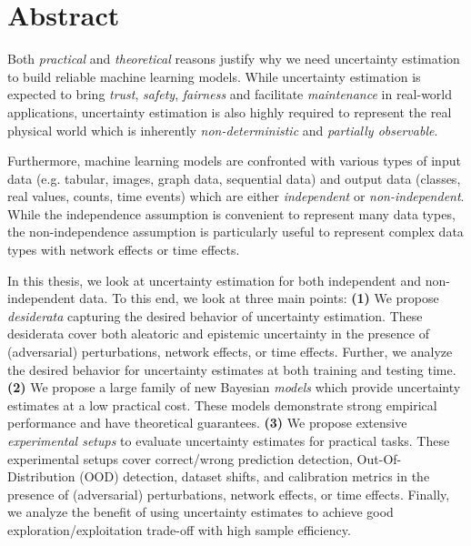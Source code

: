 \chapter*{Abstract}
%

Both \emph{practical} and \emph{theoretical} reasons justify why we need uncertainty estimation to build reliable machine learning models. While uncertainty estimation is expected to bring \emph{trust}, \emph{safety}, \emph{fairness} and facilitate \emph{maintenance} in real-world applications, uncertainty estimation is also highly required to represent the real physical world which is inherently \emph{non-deterministic} and \emph{partially observable}. 

Furthermore, machine learning models are confronted with various types of input data (e.g. tabular, images, graph data, sequential data) and output data (classes, real values, counts, time events) which are either \emph{independent} or \emph{non-independent}. While the independence assumption is convenient to represent many data types, the non-independence assumption is particularly useful to represent complex data types with network effects or time effects.

In this thesis, we look at uncertainty estimation for both independent and non-independent data. To this end, we look at three main points: \textbf{(1)} We propose \emph{desiderata} capturing the desired behavior of uncertainty estimation. These desiderata cover both aleatoric and epistemic uncertainty in the presence of (adversarial) perturbations, network effects, or time effects. Further, we analyze  the desired behavior for uncertainty estimates at both training and testing time. \textbf{(2)} We propose a large family of new Bayesian \emph{models} which provide uncertainty estimates at a low practical cost. These models demonstrate strong empirical performance and have theoretical guarantees. \textbf{(3)} We propose extensive \emph{experimental setups} to evaluate uncertainty estimates for practical tasks. These experimental setups cover correct/wrong prediction detection, Out-Of-Distribution (OOD) detection, dataset shifts, and calibration metrics in the presence of (adversarial) perturbations, network effects, or time effects. Finally, we analyze the benefit of using uncertainty estimates to achieve good exploration/exploitation trade-off with high sample efficiency.
\\
